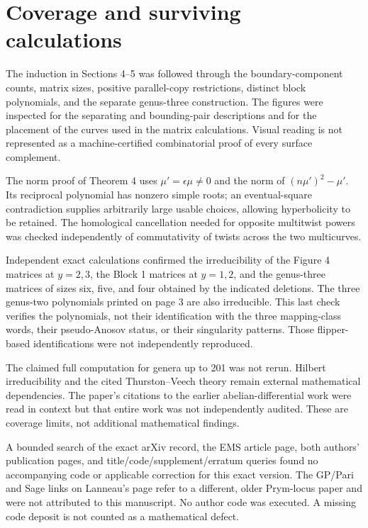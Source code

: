 \documentclass[10pt]{article}
\begin{document}
\section*{Coverage and surviving calculations}
The induction in Sections 4–5 was followed through the boundary-component counts, matrix sizes, positive parallel-copy restrictions, distinct block polynomials, and the separate genus-three construction. The figures were inspected for the separating and bounding-pair descriptions and for the placement of the curves used in the matrix calculations. Visual reading is not represented as a machine-certified combinatorial proof of every surface complement.\par
The norm proof of Theorem 4 uses \(\mu'=\epsilon\mu\ne0\) and the norm of \((n\mu')^2-\mu'\). Its reciprocal polynomial has nonzero simple roots; an eventual-square contradiction supplies arbitrarily large usable choices, allowing hyperbolicity to be retained. The homological cancellation needed for opposite multitwist powers was checked independently of commutativity of twists across the two multicurves.\par
Independent exact calculations confirmed the irreducibility of the Figure 4 matrices at \(y=2,3\), the Block 1 matrices at \(y=1,2\), and the genus-three matrices of sizes six, five, and four obtained by the indicated deletions. The three genus-two polynomials printed on page 3 are also irreducible. This last check verifies the polynomials, not their identification with the three mapping-class words, their pseudo-Anosov status, or their singularity patterns. Those flipper-based identifications were not independently reproduced.\par
The claimed full computation for genera up to 201 was not rerun. Hilbert irreducibility and the cited Thurston–Veech theory remain external mathematical dependencies. The paper’s citations to the earlier abelian-differential work were read in context but that entire work was not independently audited. These are coverage limits, not additional mathematical findings.\par
A bounded search of the exact arXiv record, the EMS article page, both authors’ publication pages, and title/code/supplement/erratum queries found no accompanying code or applicable correction for this exact version. The GP/Pari and Sage links on Lanneau’s page refer to a different, older Prym-locus paper and were not attributed to this manuscript. No author code was executed. A missing code deposit is not counted as a mathematical defect.\par
\end{document}
